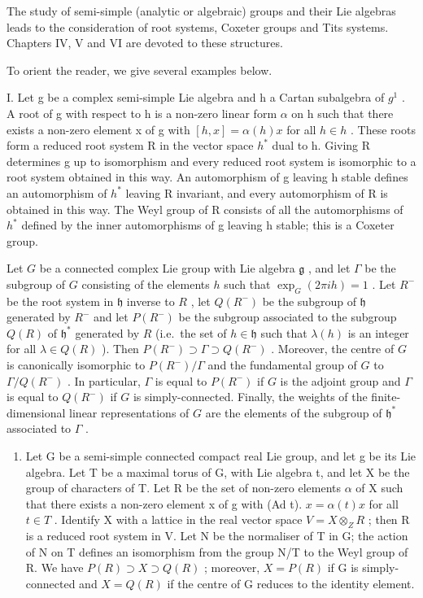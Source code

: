 
The study of semi-simple (analytic or algebraic) groups and their Lie algebras leads to the consideration of root systems, Coxeter groups and Tits systems. Chapters IV, V and VI are devoted to these structures.

To orient the reader, we give several examples below.

I. Let g be a complex semi-simple Lie algebra and h a Cartan subalgebra of \(g^{1}\) . A root of g with respect to h is a non-zero linear form \(\alpha\) on h such that there exists a non-zero element x of g with \([h, x] = \alpha(h)x\) for all \(h \in h\) . These roots form a reduced root system R in the vector space \(h^{*}\) dual to h. Giving R determines g up to isomorphism and every reduced root system is isomorphic to a root system obtained in this way. An automorphism of g leaving h stable defines an automorphism of \(h^{*}\) leaving R invariant, and every automorphism of R is obtained in this way. The Weyl group of R consists of all the automorphisms of \(h^{*}\) defined by the inner automorphisms of g leaving h stable; this is a Coxeter group.

Let \(G\) be a connected complex Lie group with Lie algebra \(\mathfrak{g}\) , and let \(\Gamma\) be the subgroup of \(G\) consisting of the elements \(h\) such that \(\exp_G(2\pi ih) = 1\) . Let \(R^-\) be the root system in \(\mathfrak{h}\) inverse to \(R\) , let \(Q(R^-)\) be the subgroup of \(\mathfrak{h}\) generated by \(R^-\) and let \(P(R^-)\) be the subgroup associated to the subgroup \(Q(R)\) of \(\mathfrak{h}^*\) generated by \(R\) (i.e.~the set of \(h \in \mathfrak{h}\) such that \(\lambda(h)\) is an integer for all \(\lambda \in Q(R)\) ). Then \(P(R^-) \supset \Gamma \supset Q(R^-)\) . Moreover, the centre of \(G\) is canonically isomorphic to \(P(R^-)/\Gamma\) and the fundamental group of \(G\) to \(\Gamma/Q(R^-)\) . In particular, \(\Gamma\) is equal to \(P(R^-)\) if \(G\) is the adjoint group and \(\Gamma\) is equal to \(Q(R^-)\) if \(G\) is simply-connected. Finally, the weights of the finite-dimensional linear representations of \(G\) are the elements of the subgroup of \(\mathfrak{h}^*\) associated to \(\Gamma\) .

\begin{enumerate}
\def\labelenumi{\Roman{enumi}.}
\setcounter{enumi}{1}
\tightlist
\item
  Let G be a semi-simple connected compact real Lie group, and let g be its Lie algebra. Let T be a maximal torus of G, with Lie algebra t, and let X be the group of characters of T. Let R be the set of non-zero elements \(\alpha\) of X such that there exists a non-zero element x of g with (Ad t). \(x = \alpha(t)x\) for all \(t \in T\) . Identify X with a lattice in the real vector space \(V = X \otimes_{Z} R\) ; then R is a reduced root system in V. Let N be the normaliser of T in G; the action of N on T defines an isomorphism from the group N/T to the Weyl group of R. We have \(P(R) \supset X \supset Q(R)\) ; moreover, \(X = P(R)\) if G is simply-connected and \(X = Q(R)\) if the centre of G reduces to the identity element.
\end{enumerate}

